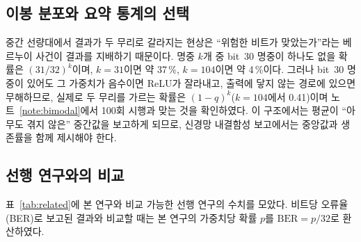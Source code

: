 \documentclass[11pt,a4paper]{article}
\newcounter{note}
\begin{document}
\subsection{이봉 분포와 요약 통계의 선택}
중간 선량대에서 결과가 두 무리로 갈라지는 현상은 ``위험한 비트가 맞았는가''라는 베르누이 사건이 결과를 지배하기 때문이다. 명중 $k$개 중 bit~30 명중이 하나도 없을 확률은 $(31/32)^{k}$이며, $k=31$이면 약 37\,\%, $k=104$이면 약 4\,\%이다. 그러나 bit~30 명중이 있어도 그 가중치가 음수이면 ReLU가 잘라내고, 출력에 닿지 않는 경로에 있으면 무해하므로, 실제로 두 무리를 가르는 확률은 $(1-q)^k$($k=104$에서 0.41)이며 노트~\ref{note:bimodal}에서 100회 시행과 맞는 것을 확인하였다. 이 구조에서는 평균이 ``아무도 겪지 않은'' 중간값을 보고하게 되므로, 신경망 내결함성 보고에서는 중앙값과 생존률을 함께 제시해야 한다.

\subsection{선행 연구와의 비교}
\label{sec:related}
표~\ref{tab:related}에 본 연구와 비교 가능한 선행 연구의 수치를 모았다. 비트당 오류율(BER)로 보고된 결과와 비교할 때는 본 연구의 가중치당 확률 $p$를 $\mathrm{BER}=p/32$로 환산하였다.
\end{document}
